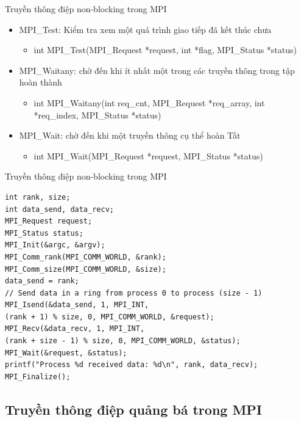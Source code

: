 \documentclass[10pt]{beamer}
\theoremstyle{remark}
\numberwithin{algocf}{section}
\numberwithin{equation}{section}
\numberwithin{dl}{section}
\numberwithin{figure}{section}
\begin{document}
\begin{frame}{Truyền thông điệp non-blocking trong MPI}
    \begin{itemize}
        \item MPI\_Test: Kiểm tra xem một quá trình giao tiếp đã kết thúc chưa
        \begin{itemize}
            \item int MPI\_Test(MPI\_Request *request, int *flag,
                                MPI\_Status *status) 
        \end{itemize}
        \item MPI\_Waitany: chờ đến khi ít nhất một trong các truyền thông trong tập hoàn thành
        \begin{itemize}
            \item int MPI\_Waitany(int req\_cnt, MPI\_Request *req\_array,
                                   int *req\_index, MPI\_Status *status) 
        \end{itemize}
        \item MPI\_Wait: chờ đến khi một truyền thông cụ thể hoàn Tất
        \begin{itemize}
            \item int MPI\_Wait(MPI\_Request *request, MPI\_Status *status)
        \end{itemize}
    \end{itemize}
\end{frame}

\begin{frame}{Truyền thông điệp non-blocking trong MPI}
    \begin{verbatim}
int rank, size;
int data_send, data_recv;
MPI_Request request;
MPI_Status status;
MPI_Init(&argc, &argv);
MPI_Comm_rank(MPI_COMM_WORLD, &rank);
MPI_Comm_size(MPI_COMM_WORLD, &size);
data_send = rank;
// Send data in a ring from process 0 to process (size - 1)
MPI_Isend(&data_send, 1, MPI_INT, 
(rank + 1) % size, 0, MPI_COMM_WORLD, &request);
MPI_Recv(&data_recv, 1, MPI_INT, 
(rank + size - 1) % size, 0, MPI_COMM_WORLD, &status);
MPI_Wait(&request, &status); 
printf("Process %d received data: %d\n", rank, data_recv);
MPI_Finalize();
    \end{verbatim}
\end{frame}

\subsection{Truyền thông điệp quảng bá trong MPI}
\end{document}

